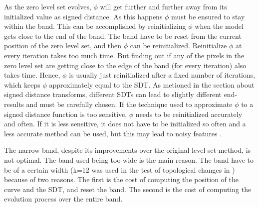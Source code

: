 As the zero level set evolves, \(\phi\) will get further and further away from its initialized value as signed distance. As this happens \(\phi\) must be ensured to stay within the band. This can be accomplished by reinitializing \(\phi\) when the model gets close to the end of the band. The band have to be reset from the current position of the zero level set, and then \(\phi\) can be reinitialized. Reinitialize \(\phi\) at every iteration takes too much time. But finding out if any of the pixels in the zero level set are getting close to the edge of the band (for every iteration) also takes time. Hence, \(\phi\) is usually just reinitialized after a fixed number of iterations, which keeps \(\phi\) approximately equal to the SDT. As metioned in the section about signed distance transforms, different SDTs can lead to slightly different end-results and must be carefully chosen. If the technique used to approximate \(\phi\) to a signed distance function is too sensitive, \(\phi\) needs to be reinitialized accurately and often. If it is less sensitive, it does not have to be initialized so often and a less accurate method can be used, but this may lead to noisy features \cite{osher02}.

The narrow band, despite its improvements over the original level set method, is not optimal. The band used being too wide is the main reason. The band have to be of a certain width (k=12 was used in the test of topological changes in \cite{adalsteinsson94}) because of two reasons\cite{whitaker89}. The first is the cost of computing the position of the curve and the SDT, and reset the band. The second is the cost of computing the evolution process over the entire band.
